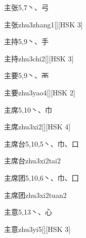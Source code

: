 \begin{entry}{主张}{5,7}{⼂、⼸}
  \begin{phonetics}{主张}{zhu3zhang1}[][HSK 3]
  \end{phonetics}
\end{entry}

\begin{entry}{主持}{5,9}{⼂、⼿}
  \begin{phonetics}{主持}{zhu3chi2}[][HSK 3]
  \end{phonetics}
\end{entry}

\begin{entry}{主要}{5,9}{⼂、⾑}
  \begin{phonetics}{主要}{zhu3yao4}[][HSK 2]
  \end{phonetics}
\end{entry}

\begin{entry}{主席}{5,10}{⼂、⼱}
  \begin{phonetics}{主席}{zhu3xi2}[][HSK 4]
  \end{phonetics}
\end{entry}

\begin{entry}{主席台}{5,10,5}{⼂、⼱、⼝}
  \begin{phonetics}{主席台}{zhu3xi2tai2}
  \end{phonetics}
\end{entry}

\begin{entry}{主席团}{5,10,6}{⼂、⼱、⼞}
  \begin{phonetics}{主席团}{zhu3xi2tuan2}
  \end{phonetics}
\end{entry}

\begin{entry}{主意}{5,13}{⼂、⼼}
  \begin{phonetics}{主意}{zhu3yi5}[][HSK 3]
  \end{phonetics}
\end{entry}

